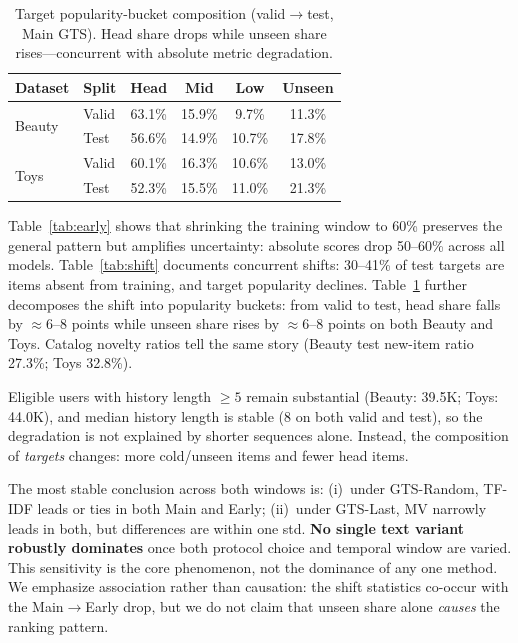 \documentclass[sigconf,natbib=true,anonymous]{acmart}
\newcommand{\tfidf}{\textsc{TF-IDF}\xspace}
\begin{document}
\begin{table}[t]
\centering
\caption{%
Target popularity-bucket composition (valid$\to$test, Main GTS).
Head share drops while unseen share rises---concurrent with absolute metric degradation.%
}
\label{tab:bucket}
\small
\setlength{\tabcolsep}{3.5pt}
\begin{tabular}{@{}llcccc@{}}
\toprule
Dataset & Split & Head & Mid & Low & Unseen \\
\midrule
\multirow{2}{*}{Beauty}
 & Valid & 63.1\% & 15.9\% & 9.7\% & 11.3\% \\
 & Test  & 56.6\% & 14.9\% & 10.7\% & 17.8\% \\
\midrule
\multirow{2}{*}{Toys}
 & Valid & 60.1\% & 16.3\% & 10.6\% & 13.0\% \\
 & Test  & 52.3\% & 15.5\% & 11.0\% & 21.3\% \\
\bottomrule
\end{tabular}
\end{table}

Table~\ref{tab:early} shows that shrinking the training window to 60\% preserves the general pattern but amplifies uncertainty: absolute scores drop 50--60\% across all models.
Table~\ref{tab:shift} documents concurrent shifts: 30--41\% of test targets are items absent from training, and target popularity declines.
Table~\ref{tab:bucket} further decomposes the shift into popularity buckets: from valid to test, head share falls by $\approx$6--8 points while unseen share rises by $\approx$6--8 points on both Beauty and Toys.
Catalog novelty ratios tell the same story (Beauty test new-item ratio 27.3\%; Toys 32.8\%).

Eligible users with history length $\ge 5$ remain substantial (Beauty: 39.5K; Toys: 44.0K), and median history length is stable (8 on both valid and test), so the degradation is not explained by shorter sequences alone.
Instead, the composition of \emph{targets} changes: more cold/unseen items and fewer head items.

The most stable conclusion across both windows is:
(i)~under GTS-Random, \tfidf leads or ties in both Main and Early;
(ii)~under GTS-Last, MV narrowly leads in both, but differences are within one std.
\textbf{No single text variant robustly dominates} once both protocol choice and temporal window are varied.
This sensitivity is the core phenomenon, not the dominance of any one method.
We emphasize association rather than causation: the shift statistics co-occur with the Main$\to$Early drop, but we do not claim that unseen share alone \emph{causes} the ranking pattern.
\end{document}
